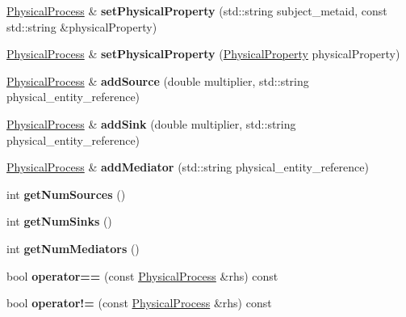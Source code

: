 \begin{DoxyCompactItemize}
\item 
\mbox{\label{classomexmeta_1_1PhysicalProcess_ac875058d67408246aa28cf58dd77ccf6}} 
\hyperlink{classomexmeta_1_1PhysicalProcess}{Physical\+Process} \& {\bfseries set\+Physical\+Property} (std\+::string subject\+\_\+metaid, const std\+::string \&physical\+Property)
\item 
\mbox{\label{classomexmeta_1_1PhysicalProcess_ac49bf4a1c21c6590a9d2af7ae93e13a7}} 
\hyperlink{classomexmeta_1_1PhysicalProcess}{Physical\+Process} \& {\bfseries set\+Physical\+Property} (\hyperlink{classomexmeta_1_1PhysicalProperty}{Physical\+Property} physical\+Property)
\item 
\mbox{\label{classomexmeta_1_1PhysicalProcess_ab42b6e17886e244f1f3c4611a5c4caef}} 
\hyperlink{classomexmeta_1_1PhysicalProcess}{Physical\+Process} \& {\bfseries add\+Source} (double multiplier, std\+::string physical\+\_\+entity\+\_\+reference)
\item 
\mbox{\label{classomexmeta_1_1PhysicalProcess_a0c41d7e4c7c750b8ab9705608ab69e74}} 
\hyperlink{classomexmeta_1_1PhysicalProcess}{Physical\+Process} \& {\bfseries add\+Sink} (double multiplier, std\+::string physical\+\_\+entity\+\_\+reference)
\item 
\mbox{\label{classomexmeta_1_1PhysicalProcess_a2bdf8dde5ffa6b38d5042db49fd211d1}} 
\hyperlink{classomexmeta_1_1PhysicalProcess}{Physical\+Process} \& {\bfseries add\+Mediator} (std\+::string physical\+\_\+entity\+\_\+reference)
\item 
\mbox{\label{classomexmeta_1_1PhysicalProcess_a56459d9f0087a3f92b0aca5d148b65f5}} 
int {\bfseries get\+Num\+Sources} ()
\item 
\mbox{\label{classomexmeta_1_1PhysicalProcess_ac8b79af15d4d19042ee34abca25f679f}} 
int {\bfseries get\+Num\+Sinks} ()
\item 
\mbox{\label{classomexmeta_1_1PhysicalProcess_a717a352ce3bb956201174002f904cd26}} 
int {\bfseries get\+Num\+Mediators} ()
\item 
\mbox{\label{classomexmeta_1_1PhysicalProcess_a65585bf5cd473d509f6f66c96757ff8d}} 
bool {\bfseries operator==} (const \hyperlink{classomexmeta_1_1PhysicalProcess}{Physical\+Process} \&rhs) const
\item 
\mbox{\label{classomexmeta_1_1PhysicalProcess_af8298394b713807ec51c2b5f60afd00e}} 
bool {\bfseries operator!=} (const \hyperlink{classomexmeta_1_1PhysicalProcess}{Physical\+Process} \&rhs) const
\end{DoxyCompactItemize}
